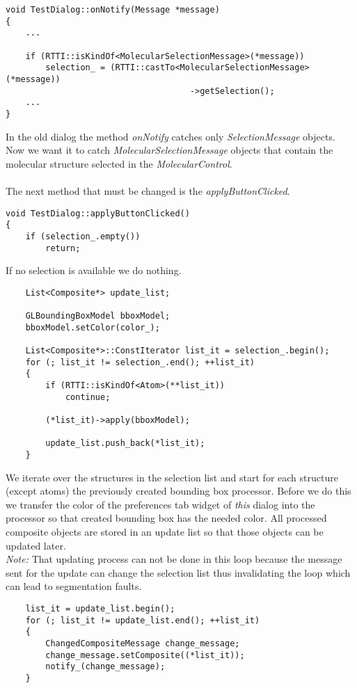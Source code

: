 \begin{verbatim}
void TestDialog::onNotify(Message *message)
{
	...

	if (RTTI::isKindOf<MolecularSelectionMessage>(*message))
		selection_ = (RTTI::castTo<MolecularSelectionMessage>(*message))
									 ->getSelection();
	...		
}
\end{verbatim}

In the old dialog the method {\em onNotify} catches only {\em SelectionMessage} objects.
Now we want it to catch {\em MolecularSelectionMessage} objects that contain the 
molecular structure selected in the {\em MolecularControl}.\\ \\
The next method that must be changed is the {\em applyButtonClicked}.

\begin{verbatim}
void TestDialog::applyButtonClicked()
{
	if (selection_.empty())
		return;
\end{verbatim}

If no selection is available we do nothing.

\begin{verbatim}
	List<Composite*> update_list;

	GLBoundingBoxModel bboxModel;
	bboxModel.setColor(color_);

	List<Composite*>::ConstIterator list_it = selection_.begin();
	for (; list_it != selection_.end(); ++list_it)
	{
		if (RTTI::isKindOf<Atom>(**list_it))
			continue;
		
		(*list_it)->apply(bboxModel);
		
		update_list.push_back(*list_it);
	}
\end{verbatim}

We iterate over the structures in the selection list and start for each
structure (except atoms) the previously created bounding box processor. Before we
do this we transfer the color of the preferences tab widget of {\em *this} dialog
into the processor so that created bounding box has the needed color.
All processed composite objects are stored in an update list so that those objects
can be updated later. \\
{\em Note: } That updating process can not be done in this loop because
the message sent for the update can change the selection list thus invalidating
the loop which can lead to segmentation faults. 
	
\begin{verbatim}
	list_it = update_list.begin();
	for (; list_it != update_list.end(); ++list_it)
	{
		ChangedCompositeMessage change_message;
		change_message.setComposite((*list_it));
		notify_(change_message);
	}
\end{verbatim}

